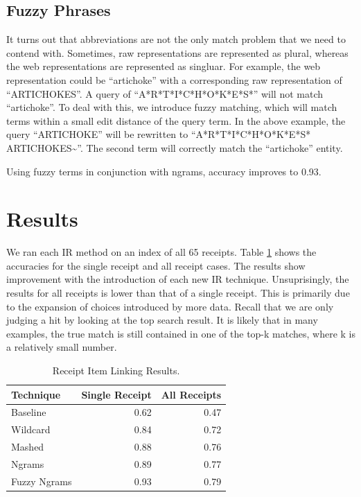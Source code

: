 \documentclass[11pt,a4paper]{article}
\begin{document}
\subsection{Fuzzy Phrases}
It turns out that abbreviations are not the only match problem that we
need to contend with.  Sometimes, raw representations are represented
as plural, whereas the web representations are represented as
singluar.  For example, the web representation could be ``artichoke''
with a corresponding raw representation of ``ARTICHOKES''.  A query
of ``A*R*T*I*C*H*O*K*E*S*'' will not match ``artichoke''.  To deal
with this, we introduce fuzzy matching, which will match terms within
a small edit distance of the query term.  In the above example, the
query ``ARTICHOKE'' will be rewritten to ``A*R*T*I*C*H*O*K*E*S*
ARTICHOKES\textasciitilde''.  The second term will correctly match the ``artichoke''
entity.

Using fuzzy terms in conjunction with ngrams, accuracy improves to
0.93. 

\section{Results}

We ran each IR method on an index of all 65 receipts.
Table \ref{table:results} shows the accuracies for the single receipt and
all receipt cases.  The results show improvement with the introduction of
each new IR technique.  Unsuprisingly, the results for all receipts is
lower than that of a single receipt.  This is primarily due to the
expansion of choices introduced by more data.  Recall that we are
only judging a hit by looking at the top search result.  It is likely
that in many examples, the true match is still contained in one of the
top-k matches, where k is a relatively small number.

\begin{table}[t!]
\begin{center}
\begin{tabular}{|l|r|r|}
\hline \textbf{Technique} & \textbf{Single Receipt} & \textbf{All Receipts} \\ \hline
Baseline & 0.62 & 0.47 \\
Wildcard & 0.84 & 0.72 \\
Mashed & 0.88 & 0.76 \\
Ngrams & 0.89 & 0.77 \\
Fuzzy Ngrams & 0.93 & 0.79 \\
\hline
\end{tabular}
\end{center}
\caption{\label{table:results} Receipt Item Linking Results. }
\end{table}
\end{document}
